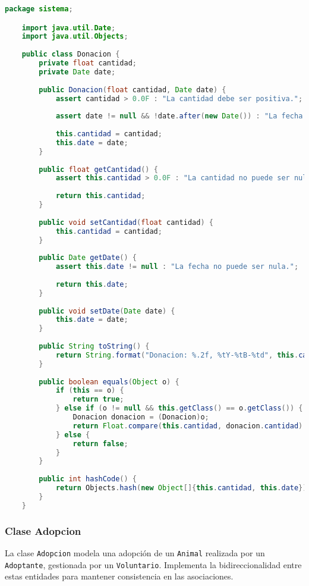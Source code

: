 \begin{lstlisting}[style = javaNormal, language=Java] 
    package sistema;

    import java.util.Date;
    import java.util.Objects;
    
    public class Donacion {
        private float cantidad;
        private Date date;
    
        public Donacion(float cantidad, Date date) {
            assert cantidad > 0.0F : "La cantidad debe ser positiva.";
    
            assert date != null && !date.after(new Date()) : "La fecha no puede ser nula ni estar en el futuro.";
    
            this.cantidad = cantidad;
            this.date = date;
        }
    
        public float getCantidad() {
            assert this.cantidad > 0.0F : "La cantidad no puede ser nula.";
    
            return this.cantidad;
        }
    
        public void setCantidad(float cantidad) {
            this.cantidad = cantidad;
        }
    
        public Date getDate() {
            assert this.date != null : "La fecha no puede ser nula.";
    
            return this.date;
        }
    
        public void setDate(Date date) {
            this.date = date;
        }
    
        public String toString() {
            return String.format("Donacion: %.2f, %tY-%tB-%td", this.cantidad, this.date, this.date, this.date);
        }
    
        public boolean equals(Object o) {
            if (this == o) {
                return true;
            } else if (o != null && this.getClass() == o.getClass()) {
                Donacion donacion = (Donacion)o;
                return Float.compare(this.cantidad, donacion.cantidad) == 0 && Objects.equals(this.date, donacion.date);
            } else {
                return false;
            }
        }
    
        public int hashCode() {
            return Objects.hash(new Object[]{this.cantidad, this.date});
        }
    }
\end{lstlisting}



\subsubsection{Clase Adopcion}\label{codigo:adopcion}
La clase \texttt{Adopcion} modela una adopción de un \texttt{Animal} realizada por un 
\texttt{Adoptante}, gestionada por un \texttt{Voluntario}. Implementa la bidireccionalidad 
entre estas entidades para mantener consistencia en las asociaciones.

